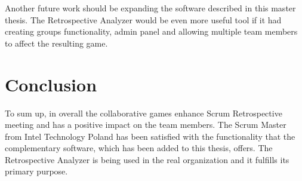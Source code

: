 Another future work should be expanding the software described in this master thesis. The Retrospective Analyzer would be even more useful tool if it had creating groups functionality, admin panel and allowing multiple team members to affect the resulting game.

\section{Conclusion}

To sum up, in overall the collaborative games enhance Scrum Retrospective meeting and has a positive impact on the team members. The Scrum Master from Intel Technology Poland has been satisfied with the functionality that the complementary software, which has been added to this thesis, offers. The Retrospective Analyzer is being used in the real organization and it fulfills its primary purpose.
